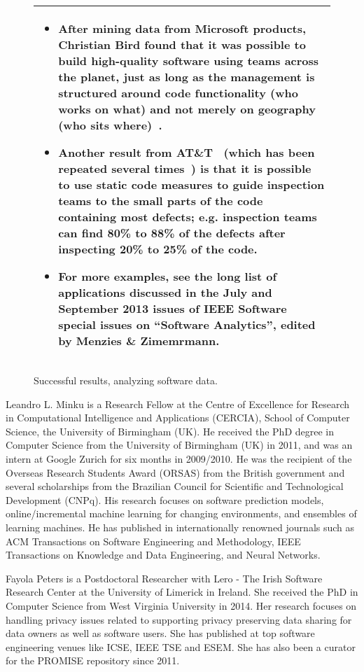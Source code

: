 \documentclass[conference]{IEEEtran}
\begin{document}
\begin{figure}[!b]
\begin{tabular}{|p{.95\linewidth}|}\hline
\begin{itemize}
\item After mining data from Microsoft products, Christian Bird found that it was  possible to build high-quality software using teams across the planet, just as long as the management is structured around code functionality (who works on what) and not merely on geography (who sits where)~\cite{bird09a}.
\item
Another result from AT\&T~\cite{ostrand04} (which has been repeated several times~\cite{me10a,tosun10}) is that it is possible to use static code measures to guide inspection teams to the small parts of the code containing most defects; e.g. inspection teams can find 80\% to 88\% of the defects after inspecting 20\% to 25\% of the code. 
\item
For more examples, see the long list of applications discussed in the July and September 2013 issues of IEEE Software special issues on “Software Analytics”, edited by Menzies \& Zimemrmann.
\end{itemize}\\\hline
\end{tabular}
\caption{Successful results, analyzing software data.}
\end{figure}

Leandro L. Minku is a Research Fellow at the Centre of Excellence for Research in Computational Intelligence and Applications (CERCIA), School of Computer Science, the University of Birmingham (UK). He received the PhD degree in Computer Science from the University of Birmingham (UK) in 2011, and was an intern at Google Zurich for six months in 2009/2010. He was the recipient of the Overseas Research Students Award (ORSAS) from the British government and several scholarships from the Brazilian Council for Scientific and Technological Development (CNPq). His research focuses on software prediction models, online/incremental machine learning for changing environments, and ensembles of learning machines. He has published in internationally renowned journals such as ACM Transactions on Software Engineering and Methodology, IEEE Transactions on Knowledge and Data Engineering, and Neural Networks.

Fayola Peters is a Postdoctoral Researcher with Lero - The Irish Software Research Center at the University of Limerick in Ireland. She received the PhD in Computer Science from West Virginia University in 2014. Her research focuses on handling privacy issues related to supporting privacy preserving data sharing for data owners as well as software users. She has published at top software engineering venues like ICSE, IEEE TSE and ESEM. She has also been a curator for the PROMISE repository since 2011.
\end{document}

